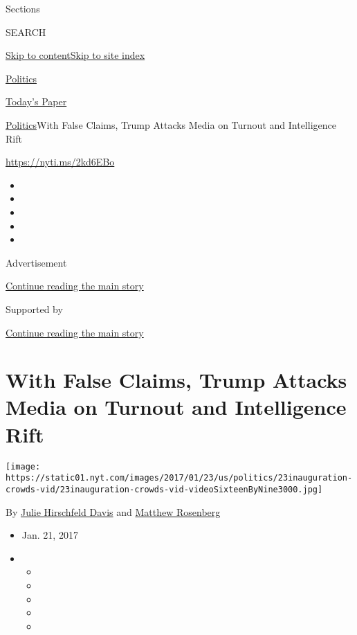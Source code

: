 Sections

SEARCH

\protect\hyperlink{site-content}{Skip to
content}\protect\hyperlink{site-index}{Skip to site index}

\href{https://www.nytimes.com/section/politics}{Politics}

\href{https://myaccount.nytimes.com/auth/login?response_type=cookie\&client_id=vi}{}

\href{https://www.nytimes.com/section/todayspaper}{Today's Paper}

\href{/section/politics}{Politics}\textbar{}With False Claims, Trump
Attacks Media on Turnout and Intelligence Rift

\url{https://nyti.ms/2kd6EBo}

\begin{itemize}
\item
\item
\item
\item
\item
\end{itemize}

Advertisement

\protect\hyperlink{after-top}{Continue reading the main story}

Supported by

\protect\hyperlink{after-sponsor}{Continue reading the main story}

\hypertarget{with-false-claims-trump-attacks-media-on-turnout-and-intelligence-rift}{%
\section{With False Claims, Trump Attacks Media on Turnout and
Intelligence
Rift}\label{with-false-claims-trump-attacks-media-on-turnout-and-intelligence-rift}}

\texttt{[image: https://static01.nyt.com/images/2017/01/23/us/politics/23inauguration-crowds-vid/23inauguration-crowds-vid-videoSixteenByNine3000.jpg]}

By \href{https://www.nytimes.com/by/julie-hirschfeld-davis}{Julie
Hirschfeld Davis} and
\href{http://www.nytimes.com/by/matthew-rosenberg}{Matthew Rosenberg}

\begin{itemize}
\item
  Jan. 21, 2017
\item
  \begin{itemize}
  \item
  \item
  \item
  \item
  \item
  \end{itemize}
\end{itemize}

